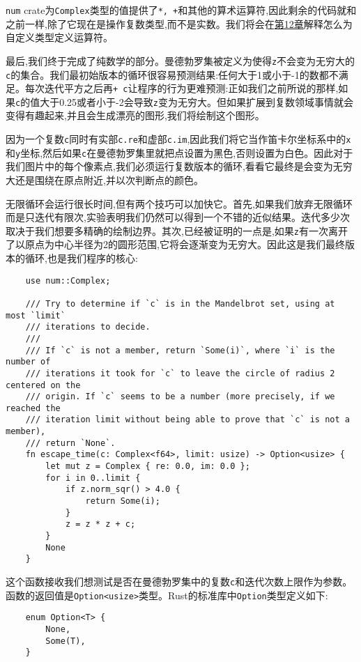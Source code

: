 \texttt{num} crate为\texttt{Complex}类型的值提供了\texttt{*, +}和其他的算术运算符,因此剩余的代码就和之前一样,除了它现在是操作复数类型,而不是实数。我们将会在\hyperref[ch12]{第12章}解释怎么为自定义类型定义运算符。

最后,我们终于完成了纯数学的部分。曼德勃罗集被定义为使得\texttt{z}不会变为无穷大的\texttt{c}的集合。我们最初始版本的循环很容易预测结果:任何大于1或小于-1的数都不满足。每次迭代平方之后再\texttt{+ c}让程序的行为更难预测:正如我们之前所说的那样,如果\texttt{c}的值大于0.25或者小于-2会导致\texttt{z}变为无穷大。但如果扩展到复数领域事情就会变得有趣起来,并且会生成漂亮的图形,我们将绘制这个图形。

因为一个复数\texttt{c}同时有实部\texttt{c.re}和虚部\texttt{c.im},因此我们将它当作笛卡尔坐标系中的\texttt{x}和\texttt{y}坐标,然后如果\texttt{c}在曼德勃罗集里就把点设置为黑色,否则设置为白色。因此对于我们图片中的每个像素点,我们必须运行复数版本的循环,看看它最终是会变为无穷大还是围绕在原点附近,并以次判断点的颜色。

无限循环会运行很长时间,但有两个技巧可以加快它。首先,如果我们放弃无限循环而是只迭代有限次,实验表明我们仍然可以得到一个不错的近似结果。迭代多少次取决于我们想要多精确的绘制边界。其次,已经被证明的一点是,如果\texttt{z}有一次离开了以原点为中心半径为2的圆形范围,它将会逐渐变为无穷大。因此这是我们最终版本的循环,也是我们程序的核心:
\begin{verbatim}
    use num::Complex;

    /// Try to determine if `c` is in the Mandelbrot set, using at most `limit`
    /// iterations to decide.
    ///
    /// If `c` is not a member, return `Some(i)`, where `i` is the number of
    /// iterations it took for `c` to leave the circle of radius 2 centered on the
    /// origin. If `c` seems to be a number (more precisely, if we reached the
    /// iteration limit without being able to prove that `c` is not a member),
    /// return `None`.
    fn escape_time(c: Complex<f64>, limit: usize) -> Option<usize> {
        let mut z = Complex { re: 0.0, im: 0.0 };
        for i in 0..limit {
            if z.norm_sqr() > 4.0 {
                return Some(i);
            }
            z = z * z + c;
        }
        None
    }
\end{verbatim}

这个函数接收我们想测试是否在曼德勃罗集中的复数\texttt{c}和迭代次数上限作为参数。函数的返回值是\texttt{Option<usize>}类型。Rust的标准库中\texttt{Option}类型定义如下:
\begin{verbatim}
    enum Option<T> {
        None,
        Some(T),
    }
\end{verbatim}

